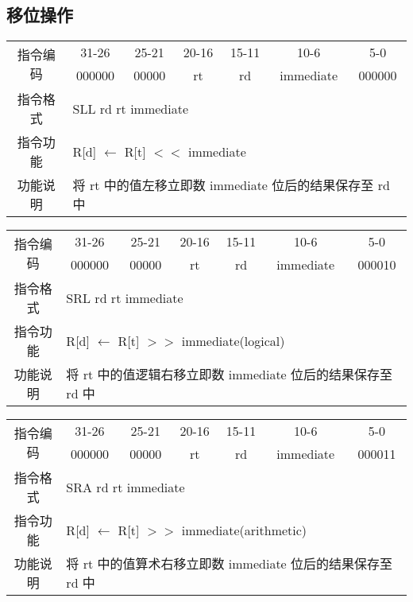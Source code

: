 \documentclass[a4paper,UTF8,fntef]{ctexart}
\begin{document}
\subsection{移位操作}
	\begin{table}[!hbp]
		\centering
		\begin{tabular}{|c|c|c|c|c|c|c|}
		\hline
		\multirow{2}{*}{指令编码} & 31-26&25-21 & 20-16&15-11 &10-6 &5-0\\
		\cline{2-7} & 000000 & 00000 & rt & rd & immediate& 000000 \\
		\hline
		指令格式&\multicolumn{6}{|l|}{SLL rd rt immediate}\\
		\hline		
		指令功能&\multicolumn{6}{|l|}{R[d] $\leftarrow$  R[t] $<<$ immediate}\\
		\hline		
		功能说明&\multicolumn{6}{|l|}{将 rt 中的值左移立即数 immediate 位后的结果保存至 rd 中}\\
		\hline
		\end{tabular}
	\end{table}
	\begin{table}[!hbp]
		\centering
		\begin{tabular}{|c|c|c|c|c|c|c|}
		\hline
		\multirow{2}{*}{指令编码} & 31-26&25-21 & 20-16&15-11 &10-6 &5-0\\
		\cline{2-7} & 000000 & 00000 & rt & rd & immediate& 000010 \\
		\hline
		指令格式&\multicolumn{6}{|l|}{SRL rd rt immediate}\\
		\hline		
		指令功能&\multicolumn{6}{|l|}{R[d] $\leftarrow$  R[t] $>>$ immediate(logical)}\\
		\hline		
		功能说明&\multicolumn{6}{|l|}{将 rt 中的值逻辑右移立即数 immediate 位后的结果保存至 rd 中}\\
		\hline
		\end{tabular}
	\end{table}
	\begin{table}[!hbp]
		\centering
		\begin{tabular}{|c|c|c|c|c|c|c|}
		\hline
		\multirow{2}{*}{指令编码} & 31-26&25-21 & 20-16&15-11 &10-6 &5-0\\
		\cline{2-7} & 000000 & 00000 & rt & rd & immediate& 000011 \\
		\hline
		指令格式&\multicolumn{6}{|l|}{SRA rd rt immediate}\\
		\hline		
		指令功能&\multicolumn{6}{|l|}{R[d] $\leftarrow$  R[t] $>>$ immediate(arithmetic)}\\
		\hline		
		功能说明&\multicolumn{6}{|l|}{将 rt 中的值算术右移立即数 immediate 位后的结果保存至 rd 中}\\
		\hline
		\end{tabular}
	\end{table}
\newpage
\end{document}
